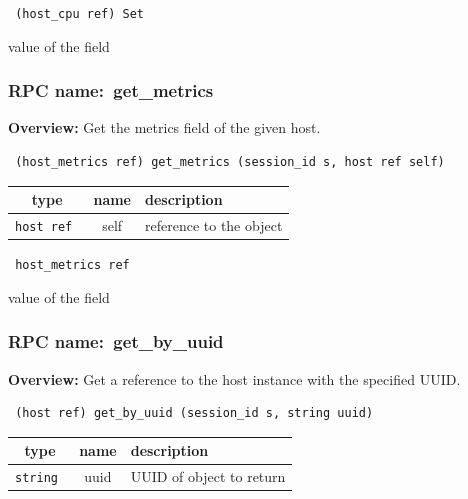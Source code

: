 \vspace{0.3cm}

{\tt 
(host\_cpu ref) Set
}


value of the field
\vspace{0.3cm}
\vspace{0.3cm}
\vspace{0.3cm}
\subsubsection{RPC name:~get\_metrics}

{\bf Overview:} 
Get the metrics field of the given host.

\begin{verbatim} (host_metrics ref) get_metrics (session_id s, host ref self)\end{verbatim}



 
\vspace{0.3cm}
\begin{tabular}{|c|c|p{7cm}|}
 \hline
{\bf type} & {\bf name} & {\bf description} \\ \hline
{\tt host ref } & self & reference to the object \\ \hline 

\end{tabular}

\vspace{0.3cm}

{\tt 
host\_metrics ref
}


value of the field
\vspace{0.3cm}
\vspace{0.3cm}
\vspace{0.3cm}
\subsubsection{RPC name:~get\_by\_uuid}

{\bf Overview:} 
Get a reference to the host instance with the specified UUID.

\begin{verbatim} (host ref) get_by_uuid (session_id s, string uuid)\end{verbatim}



 
\vspace{0.3cm}
\begin{tabular}{|c|c|p{7cm}|}
 \hline
{\bf type} & {\bf name} & {\bf description} \\ \hline
{\tt string } & uuid & UUID of object to return \\ \hline 

\end{tabular}

